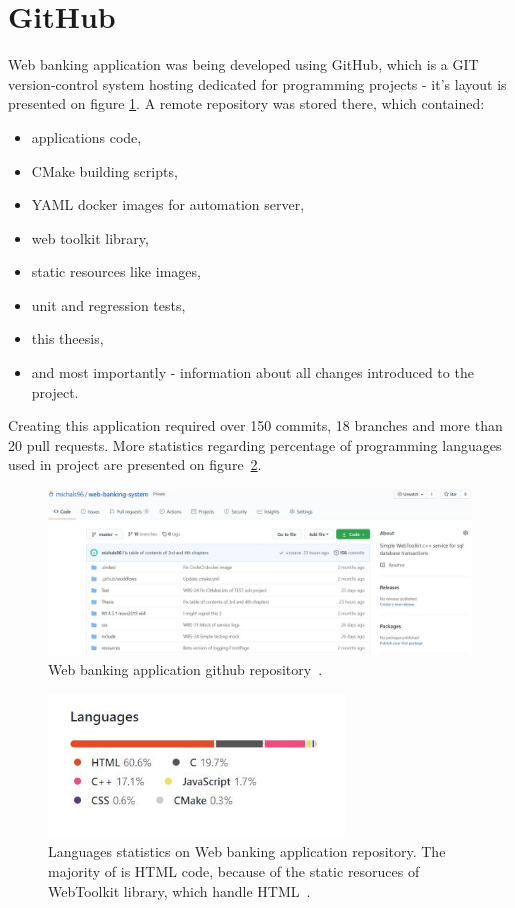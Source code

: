 \documentclass[a4paper,12pt]{book}
\newcommand\tab[1][1cm]{\hspace*{#1}}
\begin{document}
\section{GitHub}
{
\tab Web banking application was being developed using GitHub, which is a GIT version-control system hosting dedicated for programming projects - it's layout is presented on figure \ref{fig:githublayout}. A remote repository was stored there, which contained:

\begin{itemize}
	\item applications code,
	\item CMake building scripts,
	\item YAML docker images for automation server,
	\item web toolkit library,
	\item static resources like images,
	\item unit and regression tests,
	\item this theesis,
	\item and most importantly - information about all changes introduced to the project.
\end{itemize}
	
\bigskip
Creating this application required over 150 commits, 18 branches and more than 20 pull requests. More statistics regarding percentage of programming languages used in project are presented on figure~\ref{fig:stats}.

\begin{figure}[H]
  \centering
    \includegraphics[width=1.0\textwidth]{repo}
    \caption{Web banking application github repository~\cite{repo}.}
    \label{fig:githublayout}
\end{figure} 

\begin{figure}[H]
  \centering
    \includegraphics[width=0.7\textwidth]{languages}
    \caption{Languages statistics on Web banking application repository. The majority of is HTML code, because of the static resoruces of WebToolkit library, which handle HTML~\cite{repo}.}
    \label{fig:stats}
\end{figure} 
    
}
\end{document}
